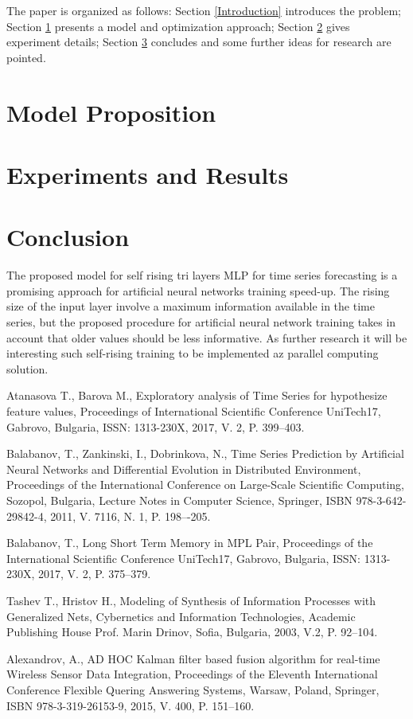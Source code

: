 \documentclass[11pt]{article}
\begin{document}
The paper is organized as follows: Section \ref{Introduction} introduces the problem; Section \ref{Model Proposition} presents a model and optimization approach; Section \ref{Experiments and Results} gives experiment details; Section \ref{Conclusion} concludes and some further ideas for research are pointed.

\section{Model Proposition} \label{Model Proposition}

\section{Experiments and Results} \label{Experiments and Results}

\section{Conclusion} \label{Conclusion}

The proposed model for self rising tri layers MLP for time series forecasting is a promising approach for artificial neural networks training speed-up. The rising size of the input layer involve a maximum information available in the time series, but the proposed procedure for artificial neural network training takes in account that older values should be less informative. As further research it will be interesting such self-rising training to be implemented az parallel computing solution. 

\begin{thebibliography}{99}

 Atanasova T., Barova M., Exploratory analysis of Time Series for hypothesize feature values, Proceedings of International Scientific Conference UniTech17, Gabrovo, Bulgaria, ISSN: 1313-230X, 2017, V. 2, P. 399--403.

 Balabanov, T., Zankinski, I., Dobrinkova, N., Time Series Prediction by Artificial Neural Networks and Differential Evolution in Distributed Environment, Proceedings of the International Conference on Large-Scale Scientific Computing, Sozopol, Bulgaria, Lecture Notes in Computer Science, Springer, ISBN 978-3-642-29842-4, 2011, V. 7116, N. 1, P. 198–-205. 

 Balabanov, T., Long Short Term Memory in MPL Pair, Proceedings of the  International Scientific Conference UniTech17, Gabrovo, Bulgaria, ISSN: 1313-230X, 2017, V. 2, P. 375--379.

 Tashev T., Hristov H., Modeling of Synthesis of Information Processes with Generalized Nets, Cybernetics and Information Technologies, Academic Publishing House Prof. Marin Drinov, Sofia, Bulgaria, 2003, V.2, P. 92--104.

 Alexandrov, A., AD HOC Kalman filter based fusion algorithm for real-time Wireless Sensor Data Integration, Proceedings of the Eleventh International Conference Flexible Quering Answering Systems, Warsaw, Poland, Springer, ISBN 978-3-319-26153-9, 2015, V. 400, P. 151--160.

\end{thebibliography}
\end{document}
